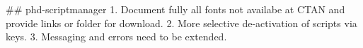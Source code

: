 ## phd-scriptmanager
1.  Document fully all fonts not availabe at CTAN and provide links or folder for download.
2.  More selective de-activation of scripts via keys.
3.  Messaging and errors need to be extended.




